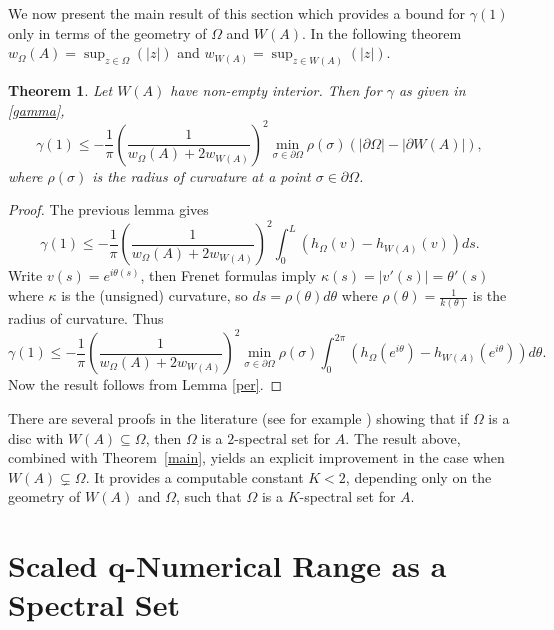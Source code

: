 \documentclass{article}
\newtheorem{Theorem}{Theorem}[section]
\begin{document}
We now present the main result of this section which provides a bound for $\gamma(1)$ only in terms of the geometry of $\Omega$ and $W(A)$. In the following theorem $w_{\Omega}(A)= \sup_{z \in \Omega}(|z|)$ and $w_{W(A)} = \sup_{z \in W(A)}(|z|)$.

\begin{Theorem}\label{maingamma}
Let $W(A)$ have non-empty interior. Then for $\gamma$ as given in \eqref{gamma},
    $$
    \gamma(1) \leq - \frac{1}{\pi }\left(\frac{1}{w_{\Omega}(A) + 2w_{W(A)}}\right)^2 \min_{\sigma \in \partial \Omega}\rho (\sigma)   \left( |\partial \Omega| -  | \partial W(A)| \right),
    $$
    where $\rho (\sigma) $ is the radius of curvature at a point $ \sigma \in \partial \Omega$.
\end{Theorem}

\begin{proof}
    The previous lemma gives
    $$
    \gamma(1) \leq  - \frac{1}{\pi }\left(\frac{1}{w_{\Omega}(A) + 2w_{W(A)}}\right)^2  \int_0^L \left( h_{\Omega}(v) - h_{W(A)}(v) \right) ds .
    $$
    Write $v(s) = e^{i \theta(s)}$, then Frenet formulas imply $\kappa(s) = |v'(s)| = \theta'(s)$ where $\kappa$ is the (unsigned) curvature, so $ds = \rho (\theta) d \theta$ where $\rho(\theta) = \frac{1}{k(\theta)}$ is the radius of curvature. Thus 
    $$
    \gamma(1) \leq  - \frac{1}{\pi }\left(\frac{1}{w_{\Omega}(A) + 2w_{W(A)}}\right)^2   \min_{\sigma \in \partial \Omega}\rho (\sigma) \int_0^{2 \pi} \left( h_{\Omega}(e^{ i \theta}) - h_{W(A)}(e^{ i \theta}) \right) d \theta .
    $$
    Now the result follows from Lemma \ref{per}.
\end{proof}

There are several proofs in the literature (see for example \cite{1root2,okubo1975constants}) showing that if $\Omega$ is a disc with $W(A)\subseteq \Omega$, then $\Omega$ is a $2$-spectral set for $A$. The result above, combined with Theorem~\ref{main}, yields an explicit improvement in the case when $W(A)\subsetneq \Omega$. It provides a computable constant $K<2$, depending only on the geometry of $W(A)$ and $\Omega$, such that $\Omega$ is a $K$-spectral set for $A$.







\section{Scaled q-Numerical Range as a Spectral Set}\label{4}
\end{document}
